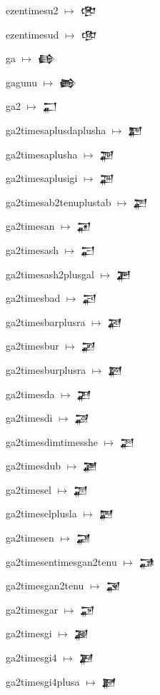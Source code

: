 {\noindent ezentimesu2 $\mapsto$ {\cufont 𒂳}\par
\noindent ezentimesud $\mapsto$ {\cufont 𒂴}\par
\noindent ga $\mapsto$ {\cufont 𒂵}\par
\noindent gagunu $\mapsto$ {\cufont 𒂶}\par
\noindent ga2 $\mapsto$ {\cufont 𒂷}\par
\noindent ga2timesaplusdaplusha $\mapsto$ {\cufont 𒂸}\par
\noindent ga2timesaplusha $\mapsto$ {\cufont 𒂹}\par
\noindent ga2timesaplusigi $\mapsto$ {\cufont 𒂺}\par
\noindent ga2timesab2tenuplustab $\mapsto$ {\cufont 𒂻}\par
\noindent ga2timesan $\mapsto$ {\cufont 𒂼}\par
\noindent ga2timesash $\mapsto$ {\cufont 𒂽}\par
\noindent ga2timesash2plusgal $\mapsto$ {\cufont 𒂾}\par
\noindent ga2timesbad $\mapsto$ {\cufont 𒂿}\par
\noindent ga2timesbarplusra $\mapsto$ {\cufont 𒃀}\par
\noindent ga2timesbur $\mapsto$ {\cufont 𒃁}\par
\noindent ga2timesburplusra $\mapsto$ {\cufont 𒃂}\par
\noindent ga2timesda $\mapsto$ {\cufont 𒃃}\par
\noindent ga2timesdi $\mapsto$ {\cufont 𒃄}\par
\noindent ga2timesdimtimesshe $\mapsto$ {\cufont 𒃅}\par
\noindent ga2timesdub $\mapsto$ {\cufont 𒃆}\par
\noindent ga2timesel $\mapsto$ {\cufont 𒃇}\par
\noindent ga2timeselplusla $\mapsto$ {\cufont 𒃈}\par
\noindent ga2timesen $\mapsto$ {\cufont 𒃉}\par
\noindent ga2timesentimesgan2tenu $\mapsto$ {\cufont 𒃊}\par
\noindent ga2timesgan2tenu $\mapsto$ {\cufont 𒃋}\par
\noindent ga2timesgar $\mapsto$ {\cufont 𒃌}\par
\noindent ga2timesgi $\mapsto$ {\cufont 𒃍}\par
\noindent ga2timesgi4 $\mapsto$ {\cufont 𒃎}\par
\noindent ga2timesgi4plusa $\mapsto$ {\cufont 𒃏}\par
}

